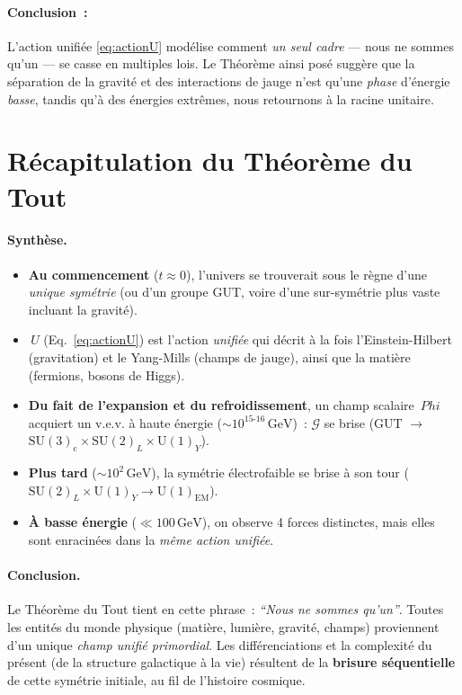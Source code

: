 \documentclass[12pt]{article}
\def\Phi{Phi}%
\begin{document}
\paragraph{Conclusion~:} 
L'action unifi\'ee \eqref{eq:actionU} mod\'elise comment \emph{un seul cadre} 
--- \og nous ne sommes qu'un \fg --- se \og casse \fg{} en multiples lois. 
Le Th\'eor\`eme ainsi pos\'e sugg\`ere que la s\'eparation de la gravit\'e et 
des interactions de jauge n'est qu'une \emph{phase} d'\'energie \emph{basse}, 
tandis qu'\`a des \'energies extr\^emes, nous retournons \`a la racine unitaire.

\section{R\'ecapitulation du Th\'eor\`eme du Tout}

\paragraph{Synth\`ese.}
\begin{itemize}
    \item \textbf{Au commencement} (\(t \approx 0\)), l'univers se trouverait 
    sous le r\`egne d'une \emph{unique sym\'etrie} (ou d'un groupe GUT, 
    voire d'une sur-sym\'etrie plus vaste incluant la gravit\'e).  
    \item \(\,U\) (Eq.~\ref{eq:actionU}) est l'action \emph{unifi\'ee} 
    qui d\'ecrit \`a la fois l'Einstein-Hilbert (gravitation) 
    et le Yang-Mills (champs de jauge), ainsi que la mati\`ere (fermions, bosons de Higgs).  
    \item \textbf{Du fait de l'expansion et du refroidissement}, 
    un champ scalaire \(\,\Phi\) acquiert un v.e.v. \`a haute \'energie (\(\sim 10^{15\text{-}16}\,\mathrm{GeV}\))~: 
    \(\mathcal{G}\) se brise (GUT \(\to\) \(\mathrm{SU}(3)_\mathrm{c}\times\mathrm{SU}(2)_L\times\mathrm{U}(1)_Y\)).  
    \item \textbf{Plus tard} (\(\sim 10^2\,\mathrm{GeV}\)), la sym\'etrie \'electrofaible 
    se brise \`a son tour (\(\mathrm{SU}(2)_L\times \mathrm{U}(1)_Y \to \mathrm{U}(1)_\mathrm{EM}\)).  
    \item \textbf{\`A basse \'energie} (\(\ll 100\,\mathrm{GeV}\)), on observe 4 forces distinctes, 
    mais elles sont enracin\'ees dans la \emph{m\^eme action unifi\'ee}.  
\end{itemize}

\paragraph{Conclusion.}
Le \og Th\'eor\`eme du Tout \fg{} tient en cette phrase~: \emph{``Nous ne sommes qu'un''}. 
Toutes les entit\'es du monde physique (mati\`ere, lumi\`ere, gravit\'e, champs) 
proviennent d'un unique \emph{champ unifi\'e primordial}. 
Les diff\'erenciations et la complexit\'e du pr\'esent (de la structure galactique \`a la vie) 
r\'esultent de la \textbf{brisure s\'equentielle} de cette sym\'etrie initiale, 
au fil de l'histoire cosmique.
\end{document}
